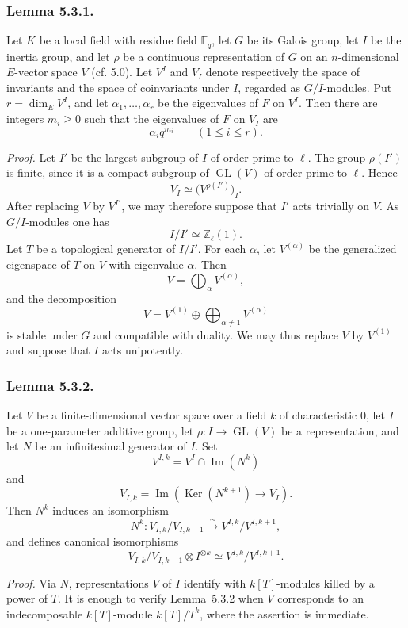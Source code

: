 \subsubsection*{Lemma 5.3.1.}
Let $K$ be a local field with residue field $\mathbb F_q$, let $G$ be its
Galois group, let $I$ be the inertia group, and let $\rho$ be a continuous
representation of $G$ on an $n$-dimensional $E$-vector space $V$ (cf. 5.0).
Let $V^I$ and $V_I$ denote respectively the space of invariants and the
space of coinvariants under $I$, regarded as $G/I$-modules.  Put
$r=\dim_E V^I$, and let $\alpha_1,\ldots,\alpha_r$ be the eigenvalues of
$F$ on $V^I$.  Then there are integers $m_i\geq0$ such that the eigenvalues
of $F$ on $V_I$ are
\[
\alpha_iq^{m_i}\qquad(1\leq i\leq r).
\]

\medskip
\noindent\emph{Proof.}
Let $I'$ be the largest subgroup of $I$ of order prime to $\ell$.  The group
$\rho(I')$ is finite, since it is a compact subgroup of $\operatorname{GL}(V)$
of order prime to $\ell$.  Hence
\[
V_I\simeq\bigl(V^{\rho(I')}\bigr)_I.
\]
After replacing $V$ by $V^{I'}$, we may therefore suppose that $I'$ acts
trivially on $V$.  As $G/I$-modules one has
\[
I/I'\simeq\mathbb Z_\ell(1).
\]
Let $T$ be a topological generator of $I/I'$.  For each $\alpha$, let
$V^{(\alpha)}$ be the generalized eigenspace of $T$ on $V$ with eigenvalue
$\alpha$.  Then
\[
V=\bigoplus_\alpha V^{(\alpha)},
\]
and the decomposition
\[
V=V^{(1)}\oplus\bigoplus_{\alpha\ne1}V^{(\alpha)}
\]
is stable under $G$ and compatible with duality.  We may thus replace $V$
by $V^{(1)}$ and suppose that $I$ acts unipotently.

\subsubsection*{Lemma 5.3.2.}
Let $V$ be a finite-dimensional vector space over a field $k$ of
characteristic $0$, let $I$ be a one-parameter additive group, let
$\rho:I\longrightarrow\operatorname{GL}(V)$ be a representation, and let
$N$ be an infinitesimal generator of $I$.  Set
\[
V^{I,k}=V^I\cap\operatorname{Im}(N^k)
\]
and
\[
V_{I,k}=\operatorname{Im}\!\left(\operatorname{Ker}(N^{k+1})
\longrightarrow V_I\right).
\]
Then $N^k$ induces an isomorphism
\[
N^k:V_{I,k}/V_{I,k-1}\xrightarrow{\sim}
V^{I,k}/V^{I,k+1},
\]
and defines canonical isomorphisms
\[
V_{I,k}/V_{I,k-1}\otimes I^{\otimes k}
\simeq V^{I,k}/V^{I,k+1}.
\]

\medskip
\noindent\emph{Proof.}
Via $N$, representations $V$ of $I$ identify with $k[T]$-modules killed by
a power of $T$.  It is enough to verify Lemma~5.3.2 when $V$ corresponds to
an indecomposable $k[T]$-module $k[T]/T^k$, where the assertion is immediate.


